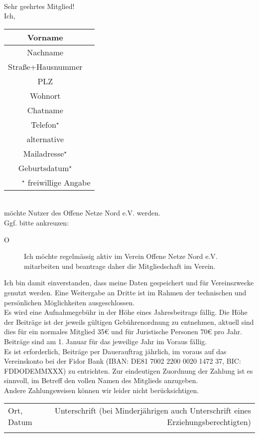 \documentclass[a4paper,8pt]{article}
\begin{document}
\ \\

Sehr geehrtes Mitglied!\\

Ich,\\
\begin{tabular}{||c|p{10cm}||}
\hline
\hline
Vorname &\\
\hline
Nachname &\\
\hline
Straße+Hausnummer &\\
\hline
PLZ &\\
\hline
Wohnort &\\
\hline
Chatname &\\
\hline
Telefon$^\star$ &\\
\hline
alternative & \multirow{2}{*}{} \\
Mailadresse$^\star$ &\\
\hline
Geburtsdatum$^\star$ &\\
\hline
\hline
\multicolumn{2}{r}{\tiny $^\star$ freiwillige Angabe}
\end{tabular}
\\
möchte Nutzer des Offene Netze Nord e.V. werden.\\

Ggf. bitte ankreuzen:
\begin{description}
\item[O] Ich möchte regelmässig aktiv im Verein Offene Netze Nord e.V. mitarbeiten und beantrage daher die Mitgliedschaft im Verein.
\end{description}

Ich bin damit einverstanden, dass meine Daten gespeichert und für Vereinszwecke genutzt werden.
Eine Weitergabe an Dritte ist im Rahmen der technischen und persönlichen Möglichkeiten ausgeschlossen.
\\

Es wird eine Aufnahmegebühr in der Höhe eines Jahresbeitrags fällig.
Die Höhe der Beiträge ist der jeweils gültigen Gebührenordnung zu entnehmen,
aktuell sind dies für ein normales Mitglied 35\euro{} und für Juristische Personen 70\euro{} pro Jahr.
\\

Beiträge sind am 1. Januar für das jeweilige Jahr im Voraus fällig.
\\

Es ist erforderlich, Beiträge per Dauerauftrag jährlich, im voraus auf das Vereinskonto bei der Fidor Bank
(IBAN: DE81 7002 2200 0020 1472 37, BIC: FDDODEMMXXX) zu ent\-richten.
Zur eindeutigen Zuordnung der Zahlung ist es sinnvoll, im Betreff den vollen Namen des Mitglieds anzugeben.
\\

Andere Zahlungsweisen können wir leider nicht berücksichtigen.
\\


\begin{tabular}{l r}
&\\
\hline
Ort, Datum & Unterschrift (bei Minderjährigen auch Unterschrift eines Erziehungsberechtigten)\\
&\\
\end{tabular}
\end{document}
